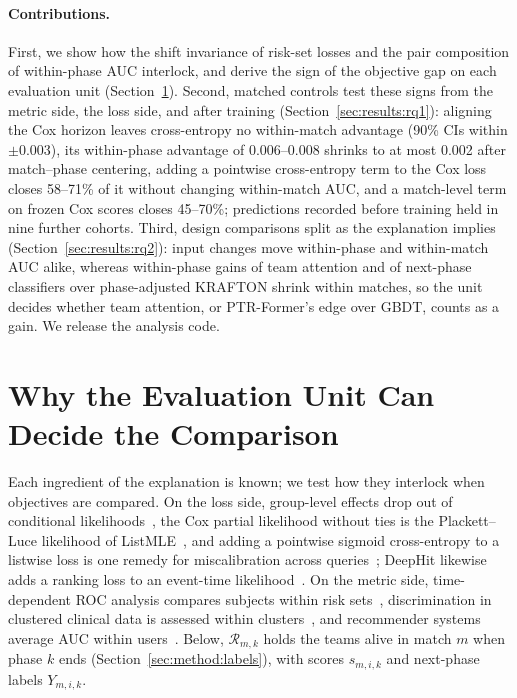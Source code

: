 \documentclass[sigconf,anonymous,nonacm]{acmart}
\begin{document}
\paragraph{Contributions.}
First, we show how the shift invariance of risk-set losses and the pair composition of within-phase AUC interlock, and derive the sign of the objective gap on each evaluation unit (Section~\ref{sec:account}). Second, matched controls test these signs from the metric side, the loss side, and after training (Section~\ref{sec:results:rq1}): aligning the Cox horizon leaves cross-entropy no within-match advantage (90\% CIs within $\pm0.003$), its within-phase advantage of 0.006--0.008 shrinks to at most 0.002 after match--phase centering, adding a pointwise cross-entropy term to the Cox loss closes 58--71\% of it without changing within-match AUC, and a match-level term on frozen Cox scores closes 45--70\%; predictions recorded before training held in nine further cohorts. Third, design comparisons split as the explanation implies (Section~\ref{sec:results:rq2}): input changes move within-phase and within-match AUC alike, whereas within-phase gains of team attention and of next-phase classifiers over phase-adjusted KRAFTON shrink within matches, so the unit decides whether team attention, or PTR-Former's edge over GBDT, counts as a gain. We release the analysis code.

\section{Why the Evaluation Unit Can Decide the Comparison}
\label{sec:account}
Each ingredient of the explanation is known; we test how they interlock when objectives are compared. On the loss side, group-level effects drop out of conditional likelihoods~\cite{Chamberlain80}, the Cox partial likelihood without ties is the Plackett--Luce likelihood of ListMLE~\cite{Xia08}, and adding a pointwise sigmoid cross-entropy to a listwise loss is one remedy for miscalibration across queries~\cite{Bai23}; DeepHit likewise adds a ranking loss to an event-time likelihood~\cite{DeepHit18,DynamicDeepHit20}. On the metric side, time-dependent ROC analysis compares subjects within risk sets~\cite{HeagertyZheng05}, discrimination in clustered clinical data is assessed within clusters~\cite{vanKlaveren14}, and recommender systems average AUC within users~\cite{Zhou18}. Below, $\mathcal{R}_{m,k}$ holds the teams alive in match $m$ when phase $k$ ends (Section~\ref{sec:method:labels}), with scores $s_{m,i,k}$ and next-phase labels $Y_{m,i,k}$.
\end{document}
